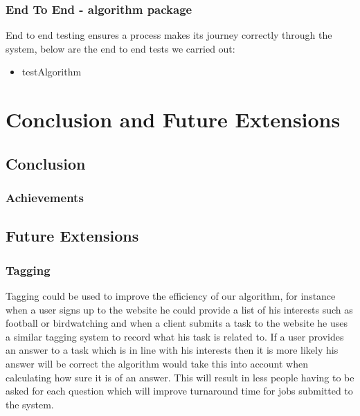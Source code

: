 \documentclass[11pt]{article}
\begin{document}
\subsubsection{End To End - algorithm package}
End to end testing ensures a process makes its journey correctly through the system, below are the end to end tests we carried out:
\begin{itemize}
\item testAlgorithm
\end{itemize}


\section{Conclusion and Future Extensions}

\subsection{Conclusion}
\subsubsection{Achievements}

\subsection{Future Extensions}

\subsubsection{Tagging}
Tagging could be used to improve the efficiency of our algorithm, for instance when a user signs up to the website he could provide a list of his interests such as football or birdwatching and when a client submits a task to the website he uses a similar tagging system to record what his task is related to. If a user provides an answer to a task which is in line with his interests then it is more likely his answer will be correct the algorithm would take this into account when calculating how sure it is of an answer. This will result in less people having to be asked for each question which will improve turnaround time for jobs submitted to the system. 
\end{document}
